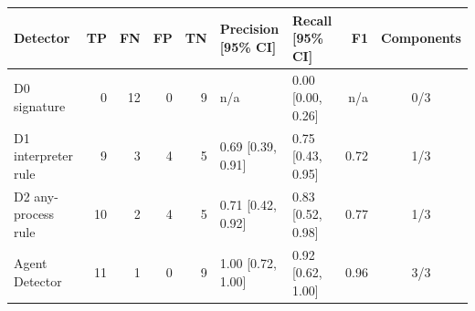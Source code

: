 \begin{tabular}{@{}l r r r r l l r c@{}}
\toprule
Detector & TP & FN & FP & TN & Precision [95\% CI] & Recall [95\% CI] & F1 & Components \\
\midrule
D0 signature & 0 & 12 & 0 & 9 & n/a & 0.00 {\scriptsize[0.00, 0.26]} & n/a & 0/3 \\
D1 interpreter rule & 9 & 3 & 4 & 5 & 0.69 {\scriptsize[0.39, 0.91]} & 0.75 {\scriptsize[0.43, 0.95]} & 0.72 & 1/3 \\
D2 any-process rule & 10 & 2 & 4 & 5 & 0.71 {\scriptsize[0.42, 0.92]} & 0.83 {\scriptsize[0.52, 0.98]} & 0.77 & 1/3 \\
Agent Detector & 11 & 1 & 0 & 9 & 1.00 {\scriptsize[0.72, 1.00]} & 0.92 {\scriptsize[0.62, 1.00]} & 0.96 & 3/3 \\
\bottomrule
\end{tabular}
